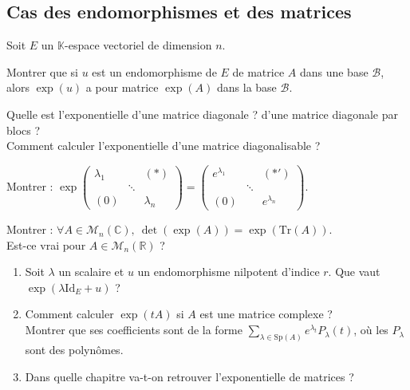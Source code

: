 \documentclass[french]{article}
\newcommand{\R}{\mathbb{R}}
\newcommand{\C}{\mathbb{C}}
\newcommand{\K}{\mathbb{K}}
\newcommand{\Tr}{\text{Tr}}
\theoremstyle{plain}
\theoremstyle{definition}
\theoremstyle{remark}
\begin{document}
\subsection{Cas des endomorphismes et des matrices}

Soit $E$ un $\K$-espace vectoriel de dimension $n$.

\begin{exo}
	Montrer que si $u$ est un endomorphisme de $E$ de matrice $A$ dans une base $\mathcal{B}$, alors $\exp(u)$ a pour matrice $\exp(A)$ dans la base $\mathcal{B}$.
\end{exo}

\begin{exo}
	Quelle est l'exponentielle d'une matrice diagonale ? d'une matrice diagonale par blocs ? \\
	Comment calculer l'exponentielle d'une matrice diagonalisable ?
\end{exo}

\begin{exo}
	Montrer : $\exp\displaystyle\begin{pmatrix}
		\lambda_1&&(*)\\
		&\ddots&\\
		(0)&&\lambda_n
	\end{pmatrix}=\begin{pmatrix}
	e^{\lambda_1}&&(*')\\
	&\ddots&\\
	(0)&&e^{\lambda_n}
	\end{pmatrix}$.
\end{exo}

\begin{exo}
	Montrer : $\forall A\in\mathcal{M}_n(\C),\ \det(\exp(A))=\exp(\Tr(A))$. \\
	Est-ce vrai pour $A\in\mathcal{M}_n(\R)$ ?
\end{exo}

\begin{exo}
	\begin{enumerate}
		\item Soit $\lambda$ un scalaire et $u$ un endomorphisme nilpotent d'indice $r$. Que vaut $\exp(\lambda\text{Id}_E+u)$ ?
		\item Comment calculer $\exp(tA)$ si $A$ est une matrice complexe ? \\
		Montrer que ses coefficients sont de la forme $\displaystyle\sum_{\lambda\in\text{Sp}(A)}e^{\lambda_t}P_\lambda(t)$, où les $P_\lambda$ sont des polynômes.
		\item Dans quelle chapitre va-t-on retrouver l'exponentielle de matrices ?
	\end{enumerate}
\end{exo}
\end{document}
